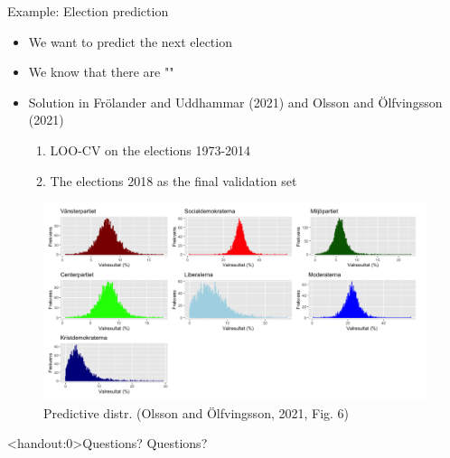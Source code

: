 \documentclass[10pt]{beamer}
\begin{document}
\begin{frame}{Example: Election prediction}

\begin{itemize}
\item We want to predict the next election
\item We know that there are ""
\item Solution in Frölander and Uddhammar (2021) and Olsson and Ölfvingsson (2021)
\begin{enumerate}
\item LOO-CV on the elections 1973-2014
\item The elections 2018 as the final validation set
\end{enumerate}


\end{itemize}

\begin{figure}[h]
\caption{Predictive distr. (Olsson and Ölfvingsson, 2021, Fig. 6)}
\centering
\includegraphics[width=1\textwidth]{figs/elections}
\end{figure}

\end{frame}

\begin{frame}<handout:0>{Questions?}
Questions?
\end{frame}



\end{document}
